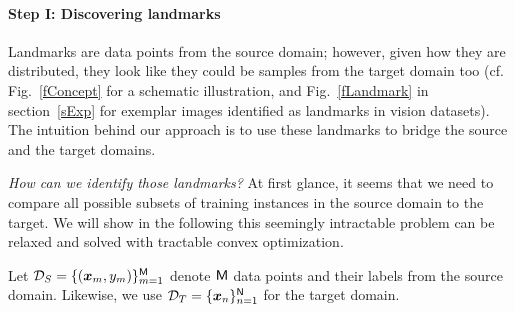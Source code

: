 




\paragraph{\bf Step I: Discovering landmarks} \label{sFindLandmark}

Landmarks are data points from the source domain; however, given how they are distributed, they look like they could be samples from the target domain too (cf. Fig.~\ref{fConcept} for a schematic illustration, and Fig.~\ref{fLandmark} in section~\ref{sExp} for exemplar images identified as landmarks in vision datasets). The intuition behind our approach is to use these landmarks to bridge the source and the target domains.

\emph{How can we identify those landmarks?}  At first glance, it seems that we need to compare all possible subsets of training instances in the source domain to the target. We will show in the following this seemingly intractable problem can be relaxed and solved with tractable convex optimization.

Let $\mathcal{D}_{S}=\{(\boldsymbol{x}_{m},y_{m})\}_{m=1}^{\mathsf{M}}$ denote $\mathsf{M}$ data points and their labels from the source domain. Likewise, we use  $\mathcal{D}_{T}=\{\boldsymbol{x}_{n}\}_{n=1}^{\mathsf{N}}$ for the target domain.

